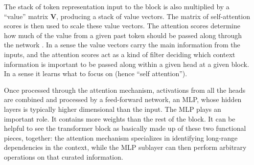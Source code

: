 The stack of token representation input to the block is also multiplied by a ``value'' matrix $\textbf{V}$, producing a stack of value vectors. The matrix of self-attention scores is then used to scale these value vectors. The attention scores determine how much of the value from a given past token should be passed along through the network \cite{beckmann2025mechanistic}. In a sense the value vectors carry the main information from the inputs, and the attention scores act as a kind of filter deciding which context information is important to be passed along within a given head at a given block. In a sense it learns what to focus on (hence ``self attention'').

Once processed through the attention mechanism, activations from all the heads are combined and processed by a
feed-forward network, an MLP, whose hidden layers is typically higher
dimensional than the input. The MLP plays an important role. It contains more
weights than the rest of the block. It can be helpful to see the transformer
block as basically made up of these two functional pieces, together: the
attention mechanism specializes in identifying long-range dependencies in the
context, while the MLP sublayer can then
perform arbitrary operations on that curated information.  


